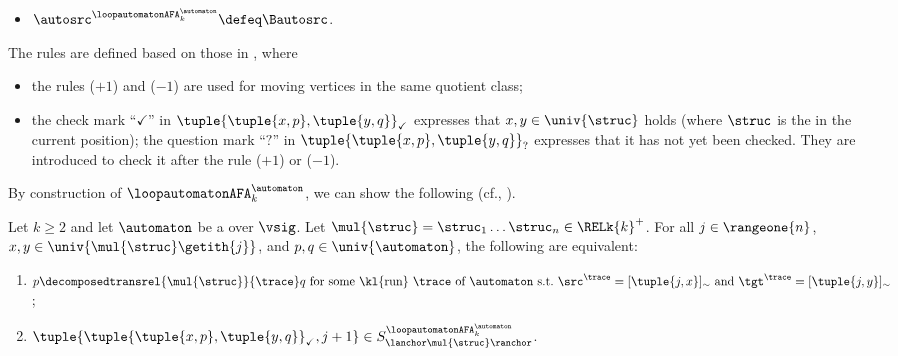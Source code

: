\begin{defi}
\begin{itemize}
\begin{gather*}
            \tuple{\tuple{\tilde{p}, \tilde{q}}_{\checkmark}, \struc} ~\leadsto~ \tuple{\tuple{\tilde{p}, \tilde{q}}_{?}, +1} \tag{$+1$}\\
            \tuple{\tuple{\tilde{p}, \tilde{q}}_{\checkmark}, \struc} ~\leadsto~ \tuple{\tuple{\tilde{p}, \tilde{q}}_{?}, -1} \tag{$-1$}\\
            \tuple{\tuple{\tilde{p}, \tilde{q}}_{?}, \struc} ~\leadsto~
            \tuple{\tuple{\tilde{p}, \tilde{q}}_{\checkmark}, 0} \quad\text{ if $\tilde{p}, \tilde{q} \in \univ{\struc} \times \univ{\automaton}$} \tag{$\checkmark$}
        \end{gather*}
        \item $\autosrc^{\loopautomatonAFA_{k}^{\automaton}} \defeq \Bautosrc$.
    \end{itemize}
\end{defi}
The rules are defined based on those in , where
\begin{itemize}
    \item the rules ($+1$) and ($-1$) are used for moving vertices in the same quotient class;
    \item the check mark ``$\checkmark$'' in $\tuple{\tuple{x, p}, \tuple{y, q}}_{\checkmark}$ expresses that $x, y \in \univ{\struc}$ holds (where $\struc$ is the  in the current position);
    the question mark ``$?$'' in $\tuple{\tuple{x, p}, \tuple{y, q}}_{?}$ expresses that it has not yet been checked.
    They are introduced to check it after the rule ($+1$) or ($-1$).
\end{itemize}
By construction of $\loopautomatonAFA_{k}^{\automaton}$, we can show the following
(cf., \cite[Proposition 5.9]{nakamuraDerivativesGraphsPositive2025}).
\begin{proposition}\label{proposition: decomposition and 2AFA}
    Let $k \ge 2$ and let $\automaton$ be a  over $\vsig$.
    Let $\mul{\struc} = \struc_1 \dots \struc_n \in \RELk{k}^{+}$.
    For all $j \in \rangeone{n}$, $x, y \in \univ{\mul{\struc}\getith{j}}$, and $p, q \in \univ{\automaton}$, the following are equivalent:
    \begin{enumerate}
        \item \label{item: decomposition and 2AFA 1} $p\decomposedtransrel{\mul{\struc}}{\trace} q \mbox{ for some \kl{run} $\trace$ of $\automaton$ s.t.\ $\src^{\trace} = [\tuple{j,x}]_{\sim}$ and $\tgt^{\trace} = [\tuple{j,y}]_{\sim}$}$;
        \item \label{item: decomposition and 2AFA 2} $\tuple{\tuple{\tuple{x, p}, \tuple{y, q}}_{\checkmark}, j+1} \in S^{{\loopautomatonAFA_{k}^{\automaton}}}_{\lanchor \mul{\struc} \ranchor}$.
    \end{enumerate}
\end{proposition}
